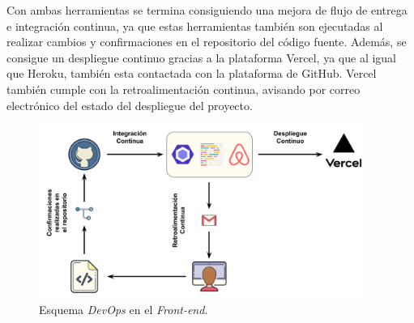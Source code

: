Con ambas herramientas se termina consiguiendo una mejora de flujo de entrega e integración continua, ya que estas herramientas también son ejecutadas al realizar cambios y confirmaciones en el repositorio del código fuente. Además, se consigue un despliegue continuo gracias a la plataforma Vercel, ya que al igual que Heroku, también esta contactada con la plataforma de GitHub. Vercel también cumple con la retroalimentación continua, avisando por correo electrónico del estado del despliegue del proyecto.

\begin{figure}[H]
    \centering
    \myfloatalign
    \includegraphics[width=0.95\textwidth]{gfx/CI-Diagram2.png}
    \caption[Esquema \textit{DevOps} en el \textit{Front-end}]{Esquema \textit{DevOps} en el \textit{Front-end}.}\label{gfx:CI-Diagram2}
\end{figure}
